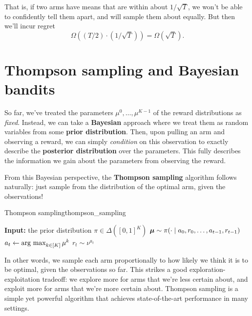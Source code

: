 \documentclass[\main/main]{subfiles}
\begin{document}
That is, if two arms have means that are within about $1/\sqrt{T}$, we won't be able to confidently tell them apart, and will sample them about equally. But then we'll incur regret \[ \Omega((T/2) \cdot (1/\sqrt{T})) = \Omega(\sqrt{T}). \]


\section{Thompson sampling and Bayesian bandits}

So far, we've treated the parameters $\mu^0, \dots, \mu^{K-1}$ of the reward distributions as \emph{fixed}. Instead, we can take a \textbf{Bayesian} approach where we treat them as random variables from some \textbf{prior distribution}. Then, upon pulling an arm and observing a reward, we can simply \emph{condition} on this observation to exactly describe the \textbf{posterior distribution} over the parameters. This fully describes the information we gain about the parameters from observing the reward.

From this Bayesian perspective, the \textbf{Thompson sampling} algorithm follows naturally: just sample from the distribution of the optimal arm, given the observations!
\begin{definition}{Thompson sampling}{thompson_sampling}
    \begin{algorithmic}
        \State \textbf{Input:} the prior distribution $\pi \in \Delta([0, 1]^K)$
        \State $\boldsymbol{\mu} \sim \pi(\cdot \mid a_0, r_0, \dots, a_{t-1}, r_{t-1})$
        \State $a_t \gets \operatorname*{\textrm{arg\ max}}_{k \in [K]} \mu^k$
        \State $r_t \sim \nu^{a_t}$
        \EndFor
    \end{algorithmic}
\end{definition}
In other words, we sample each arm proportionally to how likely we think it is to be optimal, given the observations so far.
This strikes a good exploration-exploitation tradeoff: we explore more for arms that we're less certain about, and exploit more for arms that we're more certain about.
Thompson sampling is a simple yet powerful algorithm that achieves state-of-the-art performance in many settings.
\end{document}

